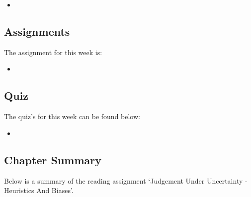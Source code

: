 \begin{itemize}
    \item {}
\end{itemize}

\subsection{Assignments}

The assignment for this week is:

\begin{itemize}
    \item {}
\end{itemize}

\subsection{Quiz}

The quiz's for this week can be found below:

\begin{itemize}
    \item {}
\end{itemize}

\subsection{Chapter Summary}

Below is a summary of the reading assignment `Judgement Under Uncertainty - Heuristics And Biases'.

